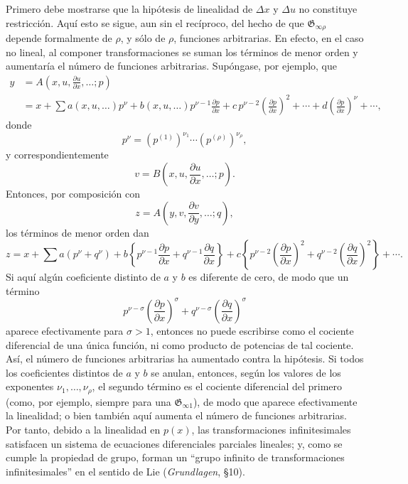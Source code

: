 \documentclass[11pt]{article}
\newcommand{\D}{\Delta}
\providecommand{\G}{\mathfrak G}
\providecommand{\p}{\partial}
\begin{document}
Primero debe mostrarse que la hipótesis de linealidad de \(\D x\) y \(\D u\) no constituye restricción. Aquí esto se sigue, aun sin el recíproco, del hecho de que \(\G_{\infty\rho}\) depende formalmente de \(\rho\), y sólo de \(\rho\), funciones arbitrarias. En efecto, en el caso no lineal, al componer transformaciones se suman los términos de menor orden y aumentaría el número de funciones arbitrarias. Supóngase, por ejemplo, que
\[
\begin{aligned}
y&=A\!\left(x,u,\frac{\p u}{\p x},\ldots;p\right)\\
&=x+\sum a(x,u,\ldots)p^\nu
+b(x,u,\ldots)p^{\nu-1}\frac{\p p}{\p x}
+c\,p^{\nu-2}\left(\frac{\p p}{\p x}\right)^2+\cdots
+d\left(\frac{\p p}{\p x}\right)^\nu+\cdots,
\end{aligned}
\]
donde
\[
p^\nu=(p^{(1)})^{\nu_1}\cdots(p^{(\rho)})^{\nu_\rho},
\]
y correspondientemente
\[
v=B\!\left(x,u,\frac{\p u}{\p x},\ldots;p\right).
\]
Entonces, por composición con
\[
z=A\!\left(y,v,\frac{\p v}{\p y},\ldots;q\right),
\]
los términos de menor orden dan
\[
z=x+\sum a(p^\nu+q^\nu)+
b\left\{p^{\nu-1}\frac{\p p}{\p x}+q^{\nu-1}\frac{\p q}{\p x}\right\}
+c\left\{p^{\nu-2}\left(\frac{\p p}{\p x}\right)^2
+q^{\nu-2}\left(\frac{\p q}{\p x}\right)^2\right\}+\cdots.
\]
Si aquí algún coeficiente distinto de \(a\) y \(b\) es diferente de cero, de modo que un término
\[
p^{\nu-\sigma}\left(\frac{\p p}{\p x}\right)^\sigma
+q^{\nu-\sigma}\left(\frac{\p q}{\p x}\right)^\sigma
\]
aparece efectivamente para \(\sigma>1\), entonces no puede escribirse como el cociente diferencial de una única función, ni como producto de potencias de tal cociente. Así, el número de funciones arbitrarias ha aumentado contra la hipótesis. Si todos los coeficientes distintos de \(a\) y \(b\) se anulan, entonces, según los valores de los exponentes \(\nu_1,\ldots,\nu_\rho\), el segundo término es el cociente diferencial del primero (como, por ejemplo, siempre para una \(\G_{\infty1}\)), de modo que aparece efectivamente la linealidad; o bien también aquí aumenta el número de funciones arbitrarias. Por tanto, debido a la linealidad en \(p(x)\), las transformaciones infinitesimales satisfacen un sistema de ecuaciones diferenciales parciales lineales; y, como se cumple la propiedad de grupo, forman un ``grupo infinito de transformaciones infinitesimales'' en el sentido de Lie (\emph{Grundlagen}, \S{}10).
\end{document}
